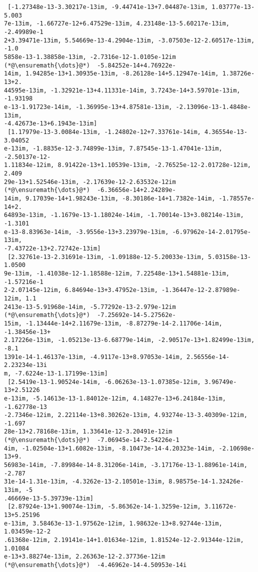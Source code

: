 \documentclass[12pt,a4paper]{article}
\begin{document}
\begin{lstlisting}
 [-1.27348e-13-3.30217e-13im, -9.44741e-13+7.04487e-13im, 1.03777e-13-5.003
7e-13im, -1.66727e-12+6.47529e-13im, 4.23148e-13-5.60217e-13im, -2.49989e-1
2+3.39471e-13im, 5.54669e-13-4.2904e-13im, -3.07503e-12-2.60517e-13im, -1.0
5858e-13-1.38858e-13im, -2.7316e-12-1.0105e-12im  (*@\ensuremath{\dots}@*)  -5.84252e-14+4.76922e-
14im, 1.94285e-13+1.30935e-13im, -8.26128e-14+5.12947e-14im, 1.38726e-13+2.
44595e-13im, -1.32921e-13+4.11331e-14im, 3.7243e-14+3.59701e-13im, -1.93198
e-13-1.91723e-14im, -1.36995e-13+4.87581e-13im, -2.13096e-13-1.4848e-13im, 
-4.42673e-13+6.1943e-13im]   
 [1.17979e-13-3.0084e-13im, -1.24802e-12+7.33761e-14im, 4.36554e-13-3.04052
e-13im, -1.8835e-12-3.74899e-13im, 7.87545e-13-1.47041e-13im, -2.50137e-12-
1.11834e-12im, 8.91422e-13+1.10539e-13im, -2.76525e-12-2.01728e-12im, 2.409
29e-13+1.52546e-13im, -2.17639e-12-2.63532e-12im  (*@\ensuremath{\dots}@*)  -6.36656e-14+2.24289e-
14im, 9.17039e-14+1.98243e-13im, -8.30186e-14+1.7382e-14im, -1.78557e-14+2.
64893e-13im, -1.1679e-13-1.18024e-14im, -1.70014e-13+3.08214e-13im, -1.3101
e-13-8.83963e-14im, -3.9556e-13+3.23979e-13im, -6.97962e-14-2.01795e-13im, 
-7.43722e-13+2.72742e-13im]  
 [2.32761e-13-2.31691e-13im, -1.09188e-12-5.20033e-13im, 5.03158e-13-1.0500
9e-13im, -1.41038e-12-1.18588e-12im, 7.22548e-13+1.54881e-13im, -1.57216e-1
2-2.07145e-12im, 6.84694e-13+3.47952e-13im, -1.36447e-12-2.87989e-12im, 1.1
2413e-13-5.91968e-14im, -5.77292e-13-2.979e-12im  (*@\ensuremath{\dots}@*)  -7.25692e-14-5.27562e-
15im, -1.13444e-14+2.11679e-13im, -8.87279e-14-2.11706e-14im, -1.38456e-13+
2.17226e-13im, -1.05213e-13-6.68779e-14im, -2.90517e-13+1.82499e-13im, -8.1
1391e-14-1.46137e-13im, -4.9117e-13+8.97053e-14im, 2.56556e-14-2.23234e-13i
m, -7.6224e-13-1.17199e-13im]
 [2.5419e-13-1.90524e-14im, -6.06263e-13-1.07385e-12im, 3.96749e-13+2.51226
e-13im, -5.14613e-13-1.84012e-12im, 4.14827e-13+6.24184e-13im, -1.62778e-13
-2.7346e-12im, 2.22114e-13+8.30262e-13im, 4.93274e-13-3.40309e-12im, -1.697
28e-13+2.78168e-13im, 1.33641e-12-3.20491e-12im  (*@\ensuremath{\dots}@*)  -7.06945e-14-2.54226e-1
4im, -1.02504e-13+1.6082e-13im, -8.10473e-14-4.20323e-14im, -2.10698e-13+9.
56983e-14im, -7.89984e-14-8.31206e-14im, -3.17176e-13-1.88961e-14im, -2.787
31e-14-1.31e-13im, -4.3262e-13-2.10501e-13im, 8.98575e-14-1.32426e-13im, -5
.46669e-13-5.39739e-13im]    
 [2.87924e-13+1.90074e-13im, -5.86362e-14-1.3259e-12im, 3.11672e-13+5.25196
e-13im, 3.58463e-13-1.97562e-12im, 1.98632e-13+8.92744e-13im, 1.03459e-12-2
.61368e-12im, 2.19141e-14+1.01634e-12im, 1.81524e-12-2.91344e-12im, 1.01084
e-13+3.88274e-13im, 2.26363e-12-2.37736e-12im  (*@\ensuremath{\dots}@*)  -4.46962e-14-4.50953e-14i

\end{lstlisting}
\end{document}

